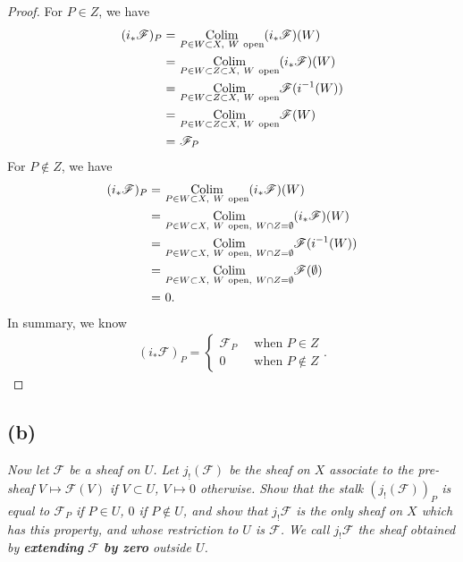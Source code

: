 \begin{proof}
    For $P\in Z$, we have 
    \begin{align*}
        (i_{\ast}\mathscr F)_P =&~ \underset{P\in W\subset X,~ W ~\text{open}}{\operatorname{Colim}} (i_{\ast}\mathscr F)(W)\\
        =&~ \underset{P\in W\subset Z\subset X,~ W ~\text{open}}{\operatorname{Colim}} (i_{\ast}\mathscr F)(W)\\
        =&~ \underset{P\in W\subset Z\subset X,~ W ~\text{open}}{\operatorname{Colim}} \mathscr F(i^{-1}(W))\\
        =&~ \underset{P\in W\subset Z\subset X,~ W ~\text{open}}{\operatorname{Colim}} \mathscr F(W)\\  
        =&~ \mathscr F_P
    \end{align*}
    For $P\notin Z$, we have 
    \begin{align*}
        (i_{\ast}\mathscr F)_P =&~ \underset{P\in W\subset X,~ W ~\text{open}}{\operatorname{Colim}} (i_{\ast}\mathscr F)(W)\\
        =&~ \underset{P\in W\subset X,~ W ~\text{open},~ W\cap Z=\emptyset }{\operatorname{Colim}} (i_{\ast}\mathscr F)(W)\\
        =&~ \underset{P\in W\subset X,~ W ~\text{open},~ W\cap Z=\emptyset }{\operatorname{Colim}} \mathscr F(i^{-1}(W))\\ 
        =&~ \underset{P\in W\subset X,~ W ~\text{open},~ W\cap Z=\emptyset }{\operatorname{Colim}} \mathscr F(\emptyset)\\  
        =&~ 0.
    \end{align*}
    In summary, we know 
    \begin{align*}
        (i_{\ast}\mathscr F)_P = \begin{cases}
            \mathscr F_P &~ \text{ when } P\in Z\\
            0 &~ \text{ when } P\notin Z
        \end{cases}.
    \end{align*}
\end{proof}

\subsection{(b)}
\textit{Now let $\mathscr F$ be a sheaf on $U$. Let $j_{!}(\mathscr F)$ be the sheaf on $X$ associate to the pre-sheaf $V\mapsto \mathscr F(V)$ if $V\subset U$, $V\mapsto 0$ otherwise. Show that the stalk $(j_{!}(\mathscr F))_P$ is equal to $\mathscr F_P$ if $P\in U$, $0$ if $P\notin U$, and show that $j_{!}\mathscr F$ is the only sheaf on $X$ which has this property, and whose restriction to $U$ is $\mathscr F$. We call $j_!\mathscr F$ the sheaf obtained by \textbf{extending} $\mathscr F$ \textbf{by zero} outside $U$. }

